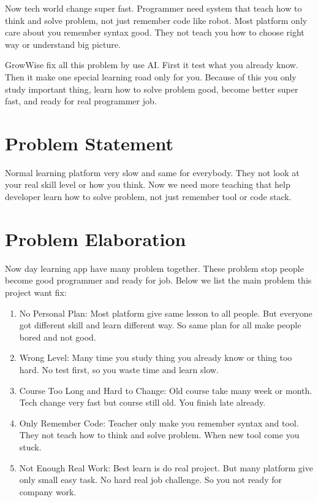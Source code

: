 \documentclass{FastFyp}
\begin{document}
Now tech world change super fast. Programmer need system that teach how to think and solve problem, not just remember code like robot. Most platform only care about you remember syntax good. They not teach you how to choose right way or understand big picture.

GrowWise fix all this problem by use AI. First it test what you already know. Then it make one special learning road only for you. Because of this you only study important thing, learn how to solve problem good, become better super fast, and ready for real programmer job.

\section{Problem Statement}

Normal learning platform very slow and same for everybody. They not look at your real skill level or how you think.  
Now we need more teaching that help developer learn how to solve problem, not just remember tool or code stack.

\section{Problem Elaboration}

Now day learning app have many problem together. These problem stop people become good programmer and ready for job. Below we list the main problem this project want fix:

\begin{enumerate}
  \item No Personal Plan: Most platform give same lesson to all people. But everyone got different skill and learn different way. So same plan for all make people bored and not good.

  \item Wrong Level: Many time you study thing you already know or thing too hard. No test first, so you waste time and learn slow.

  \item Course Too Long and Hard to Change: Old course take many week or month. Tech change very fast but course still old. You finish late already.

  \item Only Remember Code: Teacher only make you remember syntax and tool. They not teach how to think and solve problem. When new tool come you stuck.

  \item Not Enough Real Work: Best learn is do real project. But many platform give only small easy task. No hard real job challenge. So you not ready for company work.
\end{enumerate}
\end{document}
